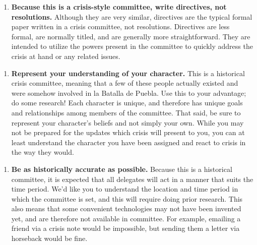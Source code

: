 \documentclass[10pt, letterpaper]{article}
\begin{document}
\begin{enumerate}
\def\labelenumi{\arabic{enumi}.}
\setcounter{enumi}{3}
\item
  
  \textbf{Because this is a crisis-style committee, write directives,
  not resolutions.} Although they are very similar, directives are the
  typical formal paper written in a crisis committee, not resolutions.
  Directives are less formal, are normally titled, and are generally
  more straightforward. They are intended to utilize the powers present
  in the committee to quickly address the crisis at hand or any related
  issues.
  
\end{enumerate}

\begin{enumerate}
\def\labelenumi{\arabic{enumi}.}
\setcounter{enumi}{4}
\item
  
  \textbf{Represent your understanding of your character.} This is a
  historical crisis committee, meaning that a few of these people
  actually existed and were somehow involved in la Batalla de Puebla.
  Use this to your advantage; do some research! Each character is
  unique, and therefore has unique goals and relationships among members
  of the committee. That said, be sure to represent your character's
  beliefs and not simply your own. While you may not be prepared for the
  updates which crisis will present to you, you can at least understand
  the character you have been assigned and react to crisis in the way
  they would.
  
\end{enumerate}

\begin{enumerate}
\def\labelenumi{\arabic{enumi}.}
\setcounter{enumi}{5}
\item
  
  \textbf{Be as historically accurate as possible.} Because this is a
  historical committee, it is expected that all delegates will act in a
  manner that suits the time period. We'd like you to understand the
  location and time period in which the committee is set, and this will
  require doing prior research. This also means that some convenient
  technologies may not have been invented yet, and are therefore not
  available in committee. For example, emailing a friend via a crisis
  note would be impossible, but sending them a letter via horseback
  would be fine.
  
\end{enumerate}
\end{document}
